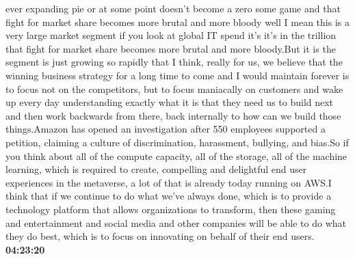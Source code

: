 \documentclass{article}%
\begin{document}
ever expanding pie or at some point doesn't become a zero some game and that fight for market share becomes more brutal and more bloody well I mean this is a very large market segment if you look at global IT spend it's it's in the trillion  that fight for market share becomes more brutal and more bloody.But it is the segment is just growing so rapidly that I think, really for us, we believe that the winning business strategy for a long time to come and I would maintain forever is to focus not on the competitors, but to focus maniacally on customers and wake up every day understanding exactly what it is that they need us to build next and then work backwards from there, back internally to how can we build those things.Amazon has opened an investigation after 550 employees supported a petition, claiming a culture of discrimination, harassment, bullying, and bias.So if you think about all of the compute capacity, all of the storage, all of the machine learning, which is required to create, compelling and delightful end user experiences in the metaverse, a lot of that is already today running on AWS.I think that if we continue to do what we've always done, which is to provide a technology platform that allows organizations to transform, then these gaming and entertainment and social media and other companies will be able to do what they do best, which is to focus on innovating on behalf of their end users.%
\textbf{04:23:20}%
\newline%
\end{document}
